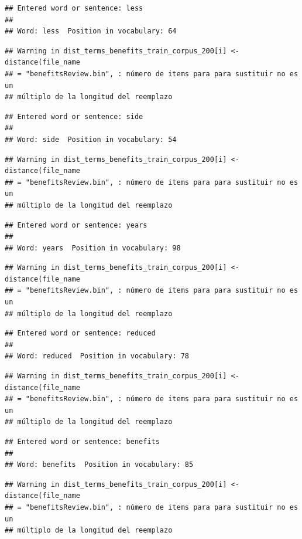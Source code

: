 \documentclass[spanish,]{article}
\begin{document}
\begin{verbatim}
## Entered word or sentence: less
## 
## Word: less  Position in vocabulary: 64
\end{verbatim}

\begin{verbatim}
## Warning in dist_terms_benefits_train_corpus_200[i] <- distance(file_name
## = "benefitsReview.bin", : número de items para para sustituir no es un
## múltiplo de la longitud del reemplazo
\end{verbatim}

\begin{verbatim}
## Entered word or sentence: side
## 
## Word: side  Position in vocabulary: 54
\end{verbatim}

\begin{verbatim}
## Warning in dist_terms_benefits_train_corpus_200[i] <- distance(file_name
## = "benefitsReview.bin", : número de items para para sustituir no es un
## múltiplo de la longitud del reemplazo
\end{verbatim}

\begin{verbatim}
## Entered word or sentence: years
## 
## Word: years  Position in vocabulary: 98
\end{verbatim}

\begin{verbatim}
## Warning in dist_terms_benefits_train_corpus_200[i] <- distance(file_name
## = "benefitsReview.bin", : número de items para para sustituir no es un
## múltiplo de la longitud del reemplazo
\end{verbatim}

\begin{verbatim}
## Entered word or sentence: reduced
## 
## Word: reduced  Position in vocabulary: 78
\end{verbatim}

\begin{verbatim}
## Warning in dist_terms_benefits_train_corpus_200[i] <- distance(file_name
## = "benefitsReview.bin", : número de items para para sustituir no es un
## múltiplo de la longitud del reemplazo
\end{verbatim}

\begin{verbatim}
## Entered word or sentence: benefits
## 
## Word: benefits  Position in vocabulary: 85
\end{verbatim}

\begin{verbatim}
## Warning in dist_terms_benefits_train_corpus_200[i] <- distance(file_name
## = "benefitsReview.bin", : número de items para para sustituir no es un
## múltiplo de la longitud del reemplazo
\end{verbatim}
\end{document}
